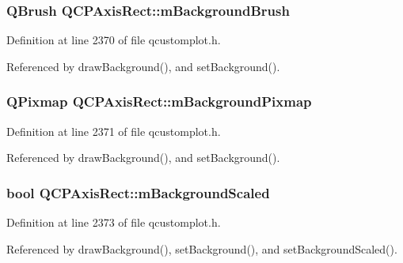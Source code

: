 \subsubsection[{m\+Background\+Brush}]{\setlength{\rightskip}{0pt plus 5cm}Q\+Brush Q\+C\+P\+Axis\+Rect\+::m\+Background\+Brush\hspace{0.3cm}{\ttfamily [protected]}}\label{class_q_c_p_axis_rect_a5748e1a37f63c428e38b0a7724b46259}


Definition at line 2370 of file qcustomplot.\+h.



Referenced by draw\+Background(), and set\+Background().

\hypertarget{class_q_c_p_axis_rect_a38fb1a15f43228a0c124553649303722}{}
\subsubsection[{m\+Background\+Pixmap}]{\setlength{\rightskip}{0pt plus 5cm}Q\+Pixmap Q\+C\+P\+Axis\+Rect\+::m\+Background\+Pixmap\hspace{0.3cm}{\ttfamily [protected]}}\label{class_q_c_p_axis_rect_a38fb1a15f43228a0c124553649303722}


Definition at line 2371 of file qcustomplot.\+h.



Referenced by draw\+Background(), and set\+Background().

\hypertarget{class_q_c_p_axis_rect_a5ad835f0fae5d7cc5ada9e063641dbf1}{}
\subsubsection[{m\+Background\+Scaled}]{\setlength{\rightskip}{0pt plus 5cm}bool Q\+C\+P\+Axis\+Rect\+::m\+Background\+Scaled\hspace{0.3cm}{\ttfamily [protected]}}\label{class_q_c_p_axis_rect_a5ad835f0fae5d7cc5ada9e063641dbf1}


Definition at line 2373 of file qcustomplot.\+h.



Referenced by draw\+Background(), set\+Background(), and set\+Background\+Scaled().

